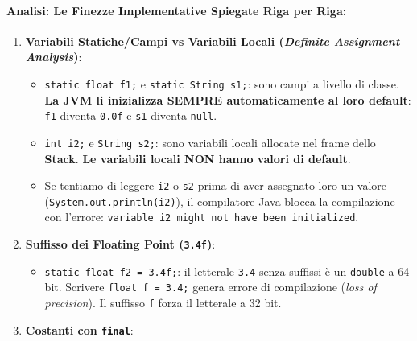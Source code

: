 \documentclass[11pt,a4paper]{article}
\newcommand{\passthrough}[1]{#1}
\providecommand{\tightlist}{\setlength{\itemsep}{0pt}\setlength{\parskip}{0pt}}
\begin{document}
\paragraph{Analisi: Le Finezze Implementative Spiegate Riga per
Riga:}\label{analisi-le-finezze-implementative-spiegate-riga-per-riga}

\begin{enumerate}
\def\labelenumi{\arabic{enumi}.}
\tightlist
\item
  \textbf{Variabili Statiche/Campi vs Variabili Locali (\emph{Definite
  Assignment Analysis})}:

  \begin{itemize}
  \tightlist
  \item
    \passthrough{\lstinline!static float f1;!} e
    \passthrough{\lstinline!static String s1;!}: sono campi a livello di
    classe. \textbf{La JVM li inizializza SEMPRE automaticamente al loro
    default}: \passthrough{\lstinline!f1!} diventa
    \passthrough{\lstinline!0.0f!} e \passthrough{\lstinline!s1!}
    diventa \passthrough{\lstinline!null!}.
  \item
    \passthrough{\lstinline!int i2;!} e
    \passthrough{\lstinline!String s2;!}: sono variabili locali allocate
    nel frame dello \textbf{Stack}. \textbf{Le variabili locali NON
    hanno valori di default}.
  \item
    Se tentiamo di leggere \passthrough{\lstinline!i2!} o
    \passthrough{\lstinline!s2!} prima di aver assegnato loro un valore
    (\passthrough{\lstinline!System.out.println(i2)!}), il compilatore
    Java blocca la compilazione con l'errore:
    \passthrough{\lstinline!variable i2 might not have been initialized!}.
  \end{itemize}
\item
  \textbf{Suffisso dei Floating Point (\passthrough{\lstinline!3.4f!})}:

  \begin{itemize}
  \tightlist
  \item
    \passthrough{\lstinline!static float f2 = 3.4f;!}: il letterale
    \passthrough{\lstinline!3.4!} senza suffissi è un
    \passthrough{\lstinline!double!} a 64 bit. Scrivere
    \passthrough{\lstinline!float f = 3.4;!} genera errore di
    compilazione (\emph{loss of precision}). Il suffisso
    \passthrough{\lstinline!f!} forza il letterale a 32 bit.
  \end{itemize}
\item
  \textbf{Costanti con \passthrough{\lstinline!final!}}:


\end{enumerate}
\end{document}
